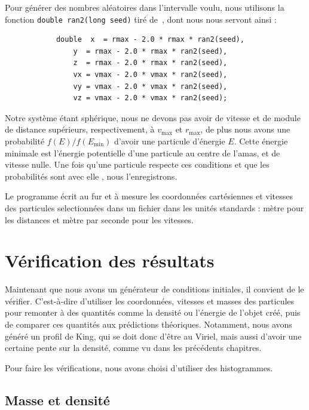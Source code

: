 		Pour générer des nombres aléatoires dans l'intervalle voulu, nous utilisons la
		fonction \verb|double ran2(long seed)| tiré de~\cite{NumericalRecipesC}, dont
		nous nous servont ainsi :
		\lstset{language=C, label=algo::tirage, frame=shadowbox}
		\begin{lstlisting}
			double  x  = rmax - 2.0 * rmax * ran2(seed),
				y  = rmax - 2.0 * rmax * ran2(seed),
				z  = rmax - 2.0 * rmax * ran2(seed),
				vx = vmax - 2.0 * vmax * ran2(seed),
				vy = vmax - 2.0 * vmax * ran2(seed),
				vz = vmax - 2.0 * vmax * ran2(seed);
		\end{lstlisting}
		Notre système étant sphérique, nous ne devons pas avoir de vitesse et de module
		de distance supérieurs, respectivement, à $v_{\mathrm{max}}$ et
		$r_{\mathrm{max}}$, de plus nous avons une probabilité
		\mbox{$f(E)/f(E_\mathrm{min})$}
		d'avoir une particule d'énergie $E$. Cette énergie minimale est l'énergie
		potentielle d'une particule au centre de l'amas, et de vitesse nulle.
		Une fois qu'une particule respecte ces conditions et que \og les probabilités sont
		avec elle \fg, nous l'enregistrons.

		Le programme écrit au fur et à mesure les coordonnées cartésiennes et vitesses
		des particules selectionnées dans un fichier dans les unités standards : mètre
		pour les distances et mètre par seconde pour les vitesses.

	\section{Vérification des résultats\label{Verif_gene}} %

		Maintenant que nous avons un générateur de conditions initiales, il convient de
		le vérifier. C'est-à-dire d'utiliser les coordonnées, vitesses et masses des
		particules pour remonter à des quantités comme la densité ou l'énergie de
		l'objet créé, puis de comparer ces quantités aux prédictions théoriques.
		Notamment, nous avons généré un profil de King, qui se doit donc d'être au
		Viriel, mais aussi d'avoir une certaine pente sur la densité, comme vu dans les
		précédents chapitres.

		Pour faire les vérifications, nous avons choisi d'utiliser des histogrammes.

		\subsection{Masse et densité}

